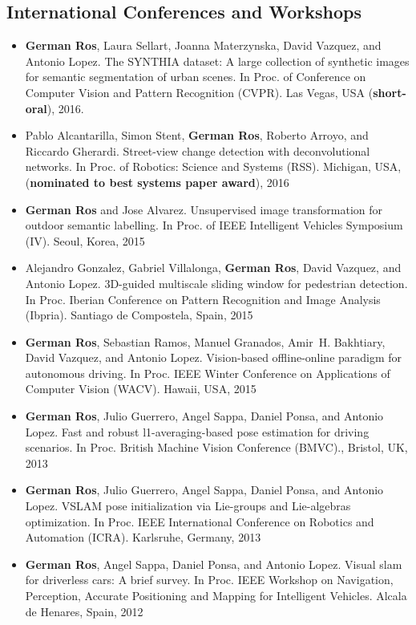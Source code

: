 \subsection{International Conferences and Workshops}
\begin{itemize}
\item \textbf{German Ros}, Laura Sellart, Joanna Materzynska, David Vazquez, and Antonio
  Lopez. The {SYNTHIA} dataset: A large collection of synthetic images for
  semantic segmentation of urban scenes. In Proc. of Conference on Computer Vision and Pattern Recognition (CVPR). Las Vegas, USA (\textbf{short-oral}), 2016.
  
\item Pablo Alcantarilla, Simon Stent, \textbf{German Ros}, Roberto Arroyo, and Riccardo
  Gherardi. Street-view change detection with deconvolutional networks. In Proc. of Robotics: Science and Systems (RSS). Michigan, USA, (\textbf{nominated to best systems paper award}), 2016

\item \textbf{German Ros} and Jose Alvarez. Unsupervised image transformation for outdoor semantic labelling. In Proc.  of IEEE Intelligent Vehicles Symposium (IV). Seoul, Korea, 2015

\item Alejandro Gonzalez, Gabriel Villalonga, \textbf{German Ros}, David Vazquez, and Antonio
  Lopez. {3D}-guided multiscale sliding window for pedestrian detection. In Proc. Iberian Conference on Pattern Recognition and Image Analysis (Ibpria). Santiago de Compostela, Spain, 2015


\item \textbf{German Ros}, Sebastian Ramos, Manuel Granados, Amir~H. Bakhtiary, David Vazquez,
  and Antonio Lopez. Vision-based offline-online paradigm for autonomous driving. In Proc. IEEE Winter Conference on Applications of Computer Vision (WACV). Hawaii, USA, 2015
  
\item \textbf{German Ros}, Julio Guerrero, Angel Sappa, Daniel Ponsa, and Antonio Lopez. Fast and robust l1-averaging-based pose estimation for driving scenarios. In Proc. British Machine Vision Conference (BMVC)., Bristol, UK, 2013
  
\item \textbf{German Ros}, Julio Guerrero, Angel Sappa, Daniel Ponsa, and Antonio Lopez. {VSLAM} pose initialization via {L}ie-groups and {L}ie-algebras optimization. In Proc. IEEE International Conference on Robotics and Automation (ICRA). Karlsruhe, Germany, 2013

\item \textbf{German Ros}, Angel Sappa, Daniel Ponsa, and Antonio Lopez. Visual slam for driverless cars: A brief survey. In Proc. IEEE Workshop on Navigation, Perception, Accurate Positioning and Mapping for Intelligent Vehicles. Alcala de Henares, Spain, 2012

\end{itemize}

